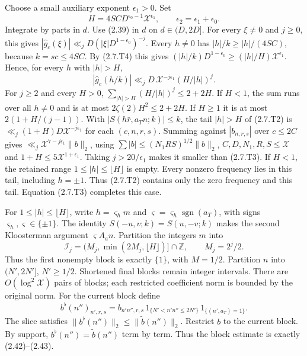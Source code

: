 Choose a small auxiliary exponent $\epsilon_1>0$. Set
\[
H=4SC D^{\epsilon_0-1}\mathcal X^{\epsilon_1},
\qquad\epsilon_2=\epsilon_1+\epsilon_0.
\tag{2.7.T4}\label{p1:eq:2.7.T4}
\]
Integrate by parts in $d$. Use (2.39) in $d$ on $d\in(D,2D]$. For every $\xi\ne0$ and $j\ge0$, this gives
$|\widehat g_c(\xi)|\ll_jD(|\xi|D^{1-\epsilon_0})^{-j}$. Every $h\ne0$ has $|h|/k\ge|h|/(4SC)$,
because $k=sc\le4SC$. By (2.7.T4) this gives $(|h|/k)D^{1-\epsilon_0}\ge(|h|/H)\mathcal X^{\epsilon_1}$.
Hence, for every $h$ with $|h|>H$,
\[
|\widehat g_c(h/k)|\ll_jD\,\mathcal X^{-j\epsilon_1}(H/|h|)^j .
\tag{2.7.T5}\label{p1:eq:2.7.T5}
\]
For $j\ge2$ and every $H>0$,
$\sum_{|h|>H}(H/|h|)^j\le2+2H$. If $H<1$, the sum runs over all $h\ne0$ and is at most
$2\zeta(2)H^2\le2+2H$. If $H\ge1$ it is at most $2(1+H/(j-1))$. With $|S(h\bar r,a_Tn;k)|\le k$,
the tail $|h|>H$ of (2.7.T2) is $\ll_j(1+H)D\mathcal X^{-j\epsilon_1}$ for each $(c,n,r,s)$. Summing
against $|b_{n,r,s}|$ over $c\le2C$ gives $\ll_j\mathcal X^{7-j\epsilon_1}\|b\|_2$, using
$\sum|b|\le(N_1RS)^{1/2}\|b\|_2$, $C,D,N_1,R,S\le\mathcal X$ and $1+H\le5\mathcal X^{1+\epsilon_1}$. Taking $j>20/\epsilon_1$ makes it smaller than (2.7.T3). If $H<1$, the retained
range $1\le|h|\le\lfloor H\rfloor$ is empty. Every nonzero frequency lies in this tail, including $h=\pm1$. Thus (2.7.T2) contains only the zero frequency and this tail. Equation (2.7.T3) completes this case.

For $1\le|h|\le\lfloor H\rfloor$, write
$h=\varsigma_hm$ and
$\varsigma=\varsigma_h\operatorname{sgn}(a_T)$, with signs
$\varsigma_h,\varsigma\in\{\pm1\}$.
The identity $S(-u,v;k)=S(u,-v;k)$ makes the second Kloosterman
argument $\varsigma A_an$. Partition the integers $m$ into
\[
\mathcal I_j=(M_j,\min(2M_j,\lfloor H\rfloor)]\cap\mathbb Z,
\qquad M_j=2^j/2.
\tag{2.7.T6}\label{p1:eq:2.7.T6}
\]
Thus the first nonempty block is exactly $\{1\}$, with $M=1/2$.
Partition $n$ into $(N',2N']$, $N'\ge1/2$. Shortened final
blocks remain integer intervals. There are $O(\log^2\mathcal X)$
pairs of blocks; each restricted coefficient norm is bounded by the
original norm.
For the current block define
\[
 b^\flat(n'')_{n',r,s}
 =b_{n'n'',r,s}\,1_{\{N'<n'n''\leq2N'\}}\,
  1_{\{(n',a_T)=1\}}.
\]
The slice satisfies $\|b^\flat(n'')\|_2\leq\|\widetilde b(n'')\|_2$.
Restrict $b$ to the current block. By support, $b^\flat(n'')=\widetilde b(n'')$ term by term. Thus the block estimate is exactly (2.42)--(2.43).

